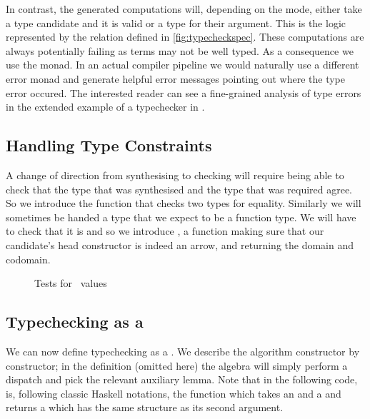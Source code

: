 In contrast, the generated computations will, depending on the mode,
either take a type candidate and  it is valid or 
a type for their argument. This is the logic represented by the 
relation defined in \cref{fig:typecheckspec}.
%
These computations are always potentially failing as terms may not be
well typed. As a consequence we use the  monad. In an actual
compiler pipeline we would naturally use a different error monad and
generate helpful error messages pointing out where the type error occured.
The interested reader can see a fine-grained analysis of type errors
in the extended example of a typechecker in
\citet{DBLP:journals/jfp/McBrideM04}.

\subsection{Handling Type Constraints}

A change of direction from synthesising to checking will require being
able to check that the type that was synthesised and the type that was
required agree. So we introduce the function  that checks
two types for equality.
%
Similarly we will sometimes be handed a type that we expect to be a
function type. We will have to check that it is and so we introduce
, a function making sure that our candidate's head
constructor is indeed an arrow, and returning the domain and codomain.

\begin{figure}[h]
\begin{minipage}[t]{0.45\textwidth}
\end{minipage}\hfill
\begin{minipage}[t]{0.45\textwidth}
\end{minipage}
\caption{Tests for ~values}
\end{figure}

\subsection{Typechecking as a }

We can now define typechecking as a \semrec{}. We describe the
algorithm constructor by constructor; in the 
definition (omitted here) the algebra will simply perform a
dispatch and pick the relevant auxiliary lemma. Note that in the
following code, \AF{\_<\$\_} is, following classic Haskell notations,
the function which takes an  and a { } and
returns a { }
which has the same structure as its second argument.

